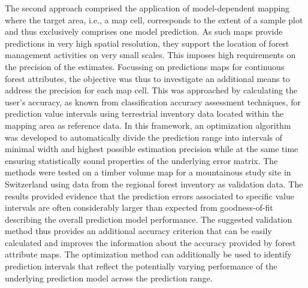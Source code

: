 The second approach comprised the application of model-dependent mapping where the target area, i.e., a map cell, corresponds to the extent of a sample plot and thus exclusively comprises one model prediction. As such maps provide predictions in very high spatial resolution, they support the location of forest management activities on very small scales. This imposes high requirements on the precision of the estimates. Focussing on predictions maps for continuous forest attributes, the objective was thus to investigate an additional means to address the precision for each map cell. This was approached by calculating the user's accuracy, as known from classification accuracy assessment techniques, for prediction value intervals using terrestrial inventory data located within the mapping area as reference data. In this framework, an optimization algorithm was developed to automatically divide the prediction range into intervals of minimal width and highest possible estimation precision while at the same time ensuring statistically sound properties of the underlying error matrix. The methods were tested on a timber volume map for a mountainous study site in Switzerland using data from the regional forest inventory as validation data. The results provided evidence that the prediction errors associated to specific value intervals are often considerably larger than expected from goodness-of-fit describing the overall prediction model performance. The suggested validation method thus provides an additional accuracy criterion that can be easily calculated and improves the information about the accuracy provided by forest attribute maps. The optimization method can additionally be used to identify prediction intervals that reflect the potentially varying performance of the underlying prediction model across the prediction range.
